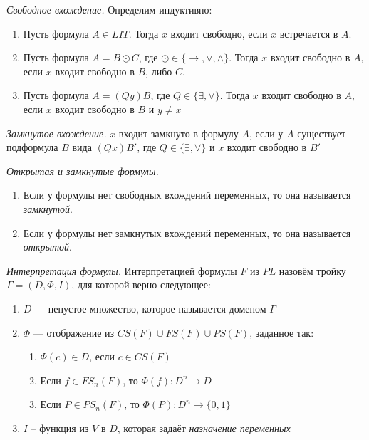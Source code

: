 \begin{definition}
  \emph{Свободное вхождение.} Определим индуктивно: 
  \begin{enumerate}
  	\item Пусть формула $A \in LIT$. Тогда $x$ входит свободно, если $x$ встречается в $A$.
    \item Пусть формула $A = B \odot C$, где $\odot \in \{ \to, \vee, \wedge \}$. Тогда $x$ входит свободно в $A$, если $x$ входит свободно в $B$, либо $C$.
    \item Пусть формула $A = (Qy)B$, где $Q \in \{ \exists, \forall \}$. Тогда $x$ входит свободно в $A$, если $x$ входит свободно в $B$ и $y \neq x$
  \end{enumerate}
\end{definition}

\begin{definition}
  \emph{Замкнутое вхождение.} $x$ входит замкнуто в формулу $A$, если у $A$ существует подформула $B$ вида $(Qx)B'$, где $Q \in \{ \exists, \forall \}$ и $x$ входит свободно в $B'$
\end{definition}

\begin{definition}
  \emph{Открытая и замкнутые формулы.}
    \begin{enumerate}
      \item Если у формулы нет свободных вхождений переменных, то она называется \textit{замкнутой}.
      \item Если у формулы нет замкнутых вхождений переменных, то она называется \textit{открытой}.
    \end{enumerate}
\end{definition}

\begin{definition}
  \emph{Интерпретация формулы.} Интерпретацией формулы $F$ из $PL$ назовём тройку $\Gamma = (D, \Phi, I)$, для которой верно следующее:
    \begin{enumerate}
		\item $D$ --- непустое множество, которое называется доменом $\Gamma$
        \item $\Phi$ --- отображение из $CS(F) \cup FS(F) \cup PS(F)$, заданное так:
          \begin{enumerate}
              \item $\Phi(c) \in D$, если $c \in CS(F)$
              \item Если $f \in FS_n(F)$, то $\Phi(f) : D^n \rightarrow D$
              \item Если $P \in PS_n(F)$, то $\Phi(P) : D^n \rightarrow \{ 0, 1 \}$
          \end{enumerate}
        \item $I$ -- функция из $V$ в $D$, которая задаёт \textit{назначение переменных}
    \end{enumerate}

\end{definition}



